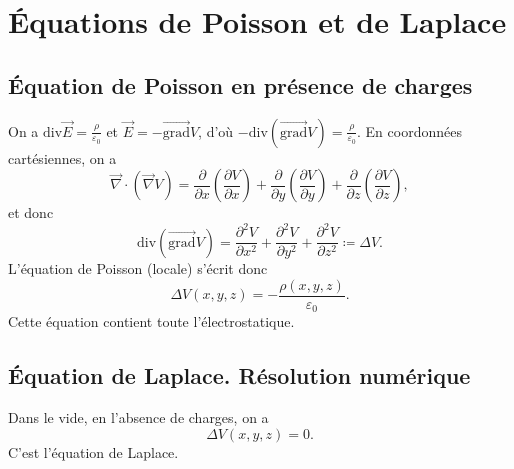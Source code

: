 \section{Équations de Poisson et de Laplace}

    \subsection{Équation de Poisson en présence de charges}

        On a $\mathrm{div}\vec{E}=\frac{\rho}{\varepsilon_0}$ et $\vec{E}=-\vec{\mathrm{grad}}V$, d'où $-\mathrm{div}(\vec{\mathrm{grad}}V)=\frac{\rho}{\varepsilon_0}$. En coordonnées cartésiennes, on a 
        \begin{equation}
            \vec{\nabla}\cdot(\vec{\nabla}V)=\frac{\partial}{\partial x}\left(\frac{\partial V}{\partial x}\right)+\frac{\partial}{\partial y}\left(\frac{\partial V}{\partial y}\right)+\frac{\partial}{\partial z}\left(\frac{\partial V}{\partial z}\right),
        \end{equation}
        et donc 
        \begin{equation}
            \boxed{
                \mathrm{div}\left(\vec{\mathrm{grad}}V\right)=\frac{\partial^{2}V}{\partial x^{2}}+\frac{\partial^{2}V}{\partial y^{2}}+\frac{\partial^{2}V}{\partial z^{2}}\coloneqq\Delta V.
            }
        \end{equation}
        L'équation de Poisson (locale) s'écrit donc
        \begin{equation}
            \boxed{
                \Delta V(x,y,z)=-\frac{\rho(x,y,z)}{\varepsilon_0}.
            }
        \end{equation}
        Cette équation contient \og toute l'électrostatique\fg.

    \subsection{Équation de Laplace. Résolution numérique}

        Dans le vide, en l'absence de charges, on a 
        \begin{equation}
            \boxed{
                \Delta V(x,y,z)=0.
            }
        \end{equation}
        C'est l'équation de Laplace. 

